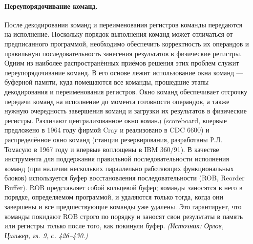 \documentclass[a4paper,12pt]{article}
\begin{document}
\paragraph{Переупорядочивание команд.}
После декодирования команд и переименования регистров команды передаются на исполнение. Поскольку порядок выполнения команд может отличаться от предписанного программой, необходимо обеспечить корректность их операндов и правильную последовательность занесения результатов в физические регистры. Одним из наиболее распространённых приёмов решения этих проблем служит переупорядочивание команд. В его основе лежит использование окна команд --- буферной памяти, куда помещаются все команды, прошедшие этапы декодирования и переименования регистров. Окно команд обеспечивает отсрочку передачи команд на исполнение до момента готовности операндов, а также нужную очередность завершения команд и загрузки их результатов в физические регистры. Различают централизованное окно команд (scoreboard, впервые предложено в 1964 году фирмой Cray и реализовано в CDC 6600) и распределённое окно команд (станции резервирования, разработаны Р.Л. Томасуло в 1967 году и впервые воплощены в IBM 360/91). В качестве инструмента для поддержания правильной последовательности исполнения команд (при наличии нескольких параллельно работающих функциональных блоков) используется буфер восстановления последовательности (ROB, Reorder Buffer). ROB представляет собой кольцевой буфер; команды заносятся в него в порядке, определяемом программой, и удаляются только тогда, когда они завершены и все предшествующие команды уже удалены. Это гарантирует, что команды покидают ROB строго по порядку и заносят свои результаты в память или регистры только после того, как покинули буфер.
\textit{(Источник: Орлов, Цилькер, гл. 9, с. 426--430.)}
\end{document}
